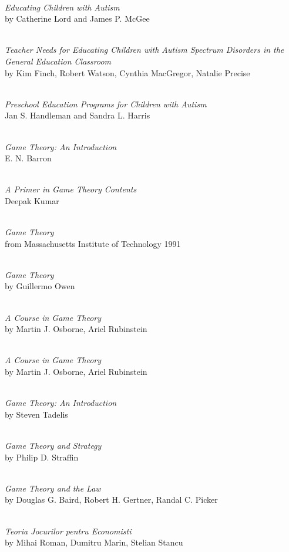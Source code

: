 

\begin{thebibliography}{9}

\\\textit{Educating Children with Autism}
\\\textmd{by Catherine Lord and James P. McGee}

\\\textit{Teacher Needs for Educating Children with Autism Spectrum Disorders in the General Education Classroom}
\\\textmd{by Kim Finch, Robert Watson, Cynthia MacGregor, Natalie Precise}

\\\textit{Preschool Education Programs for Children with Autism}
\\\textmd{Jan S. Handleman and Sandra L. Harris}



\\\textit{Game Theory: An Introduction}
\\\textmd{E. N. Barron}

\\\textit{A Primer in Game Theory Contents}
\\\textmd{Deepak Kumar}

\\\textit{Game Theory}
\\\textmd{from Massachusetts Institute of Technology 1991}

\\\textit{Game Theory}
\\\textmd{by Guillermo Owen}

\\\textit{A Course in Game Theory}
\\\textmd{by Martin J. Osborne, Ariel Rubinstein}

\\\textit{A Course in Game Theory}
\\\textmd{by Martin J. Osborne, Ariel Rubinstein}

\\\textit{Game Theory: An Introduction}
\\\textmd{by Steven Tadelis}

\\\textit{Game Theory and Strategy}
\\\textmd{by Philip D. Straffin}

\\\textit{Game Theory and the Law}
\\\textmd{by Douglas G. Baird, Robert H. Gertner, Randal C. Picker}

\\\textit{Teoria Jocurilor pentru Economisti}
\\\textmd{by Mihai Roman, Dumitru Marin, Stelian Stancu}





\end{thebibliography}